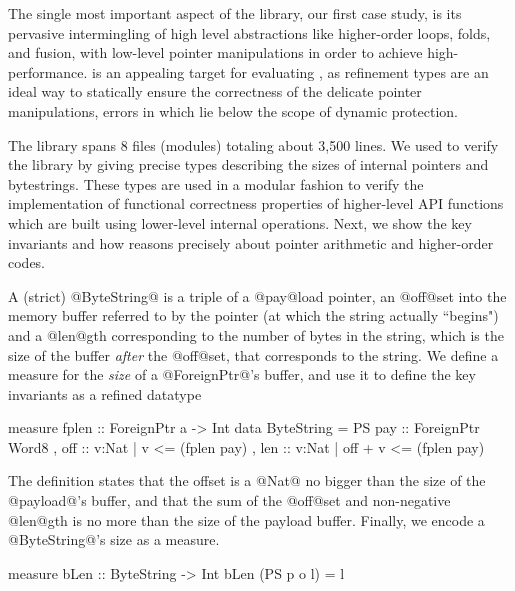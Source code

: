 The single most important aspect of the \bytestring 
library,%
our first case study, is its pervasive intermingling of
high level abstractions like higher-order loops,
folds, and fusion, with low-level pointer 
manipulations in order to achieve high-performance. 
%
%
\bytestring is an appealing target for evaluating
\toolname, as refinement types are an ideal way to 
statically ensure the correctness of the delicate 
pointer manipulations, errors in which lie below 
the scope of dynamic protection.

The library spans $8$ files (modules) totaling about 3,500 lines.
We used \toolname to verify the library by giving precise 
types describing the sizes of internal pointers and bytestrings. 
These types are used in a modular fashion to verify the 
implementation of functional correctness properties of 
higher-level API functions which are built using 
lower-level internal operations. 
Next, we show the key invariants and how
\toolname reasons precisely about pointer
arithmetic and higher-order codes.

A (strict) @ByteString@ is a triple of a @pay@load pointer, 
an @off@set into the memory buffer referred to by the pointer 
(at which the string actually ``begins") and a @len@gth 
corresponding to the number of bytes in the string, which is 
the size of the buffer \emph{after} the @off@set, that
corresponds to the string.
%
We define a measure for the \emph{size} of 
a @ForeignPtr@'s buffer, and use it to define 
the key invariants as a refined datatype 
%
\begin{code}
  measure fplen  :: ForeignPtr a -> Int
  data ByteString = PS
   { pay :: ForeignPtr Word8
   , off :: {v:Nat | v       <= (fplen pay)}
   , len :: {v:Nat | off + v <= (fplen pay)} }
\end{code}
%
The definition states that 
the offset is a @Nat@ no bigger than the size of 
the @payload@'s buffer, and that
the sum of the @off@set and non-negative @len@gth
is no more than the size of the payload buffer.
Finally, we encode a @ByteString@'s size as a measure.
%
\begin{code}
  measure bLen   :: ByteString -> Int
  bLen (PS p o l) = l
\end{code}

